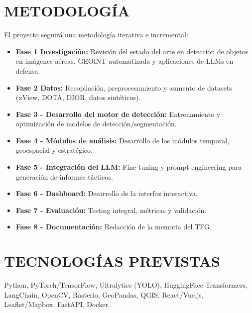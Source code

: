 \documentclass[12pt, a4paper]{article}
\begin{document}
\section*{METODOLOGÍA}

El proyecto seguirá una metodología iterativa e incremental: 

\begin{itemize}
    \item \textbf{Fase 1 Investigación:} Revisión del estado del arte en detección de objetos en imágenes aéreas, GEOINT automatizada y aplicaciones de LLMs en defensa.
    \item \textbf{Fase 2 Datos:} Recopilación, preprocesamiento y aumento de datasets (xView, DOTA, DIOR, datos sintéticos).
    \item \textbf{Fase 3 - Desarrollo del motor de detección:} Entrenamiento y optimización de modelos de detección/segmentación.
    \item \textbf{Fase 4 - Módulos de análisis:} Desarrollo de los módulos temporal, geoespacial y estratégico.
    \item \textbf{Fase 5 - Integración del LLM:} Fine-tuning y prompt engineering para generación de informes tácticos.
    \item \textbf{Fase 6 - Dashboard:} Desarrollo de la interfaz interactiva.
    \item \textbf{Fase 7 - Evaluación:} Testing integral, métricas y validación.
    \item \textbf{Fase 8 - Documentación:} Redacción de la memoria del TFG.
\end{itemize}

\section*{TECNOLOGÍAS PREVISTAS} 

Python, PyTorch/TensorFlow, Ultralytics (YOLO), HuggingFace Transformers, LangChain, OpenCV, Rasterio, GeoPandas, QGIS, React/Vue.js, Leaflet/Mapbox, FastAPI, Docker.
\end{document}
